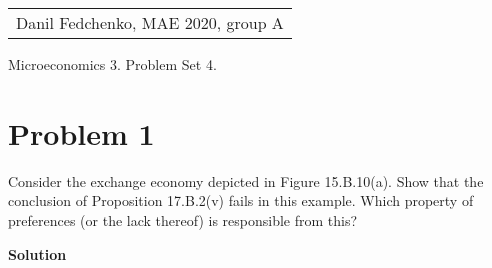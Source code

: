 \documentclass[a4paper]{article}
\begin{document}
	\begin{flushright}
	\begin{tabular}{r}
		Danil Fedchenko, MAE 2020, group A \\
	\end{tabular}
\end{flushright}


\begin{center}
	Microeconomics 3. Problem Set 4.
\end{center}
\section*{Problem 1}
Consider the exchange economy depicted in Figure 15.B.10(a). Show that the conclusion
of Proposition 17.B.2(v) fails in this example. Which property of preferences (or the lack
thereof) is responsible from this?



\textbf{Solution}
\end{document}
